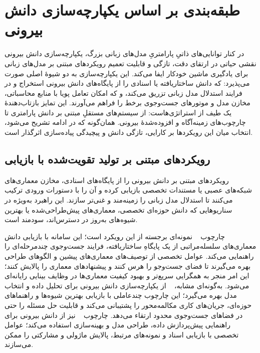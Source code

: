 \section{طبقه‌بندی بر اساس یکپارچه‌سازی دانش بیرونی}
در کنار توانایی‌های ذاتیِ پارامتریِ مدل‌های زبانی بزرگ، یکپارچه‌سازی دانش بیرونی نقشی حیاتی در ارتقای دقت، تازگی و قابلیت تعمیم رویکردهای مبتنی بر مدل‌های زبانی برای یادگیری ماشین خودکار ایفا می‌کند. این یکپارچه‌سازی به دو شیوهٔ اصلی صورت می‌پذیرد:  که دانش ساختاریافته یا اسنادی را از پایگاه‌های دانش بیرونی استخراج و در فرایند استدلال مدل زبانی تزریق می‌کند، و  که امکان تعامل پویا با منابع محاسباتی، مخازن مدل و موتورهای جست‌وجوی برخط را فراهم می‌آورند. این تمایز بازتاب‌دهندهٔ یک طیف از استراتژی‌هاست: از سیستم‌های مستقلِ مبتنی بر دانش پارامتری تا چارچوب‌های زمینه‌آگاه و افزوده‌شدهٔ بیرونی. همان‌گونه که در ادامه تشریح می‌شود، انتخاب میان این رویکردها بر کارایی، تازگی دانش و پیچیدگی پیاده‌سازی اثرگذار است.

\subsection{رویکردهای مبتنی بر تولید تقویت‌شده با بازیابی}
رویکردهای مبتنی بر  دانش بیرونی را از پایگاه‌های اسنادی، مخازن معماری‌های شبکه‌های عصبی یا مستندات تخصصی بازیابی کرده و آن را با دستورات ورودی ترکیب می‌کنند تا استدلال مدل زبانی را زمینه‌مند و غنی‌تر سازند. این راهبرد به‌ویژه در سناریوهایی که دانش حوزه‌ای تخصصی، معماری‌های پیش‌طراحی‌شده یا بهترین شیوه‌های به‌روز در دسترس‌اند، سودمند است.

چارچوب ~\cite{Yang2025NADER} نمونه‌ای برجسته از این رویکرد است؛ این سامانه با بازیابی دانش معماری‌های سلسله‌مراتبی از یک پایگاهِ ساختاریافته، فرایند جست‌وجوی چندمرحله‌ای را راهنمایی می‌کند. عوامل تخصصی از توصیف‌های معماری‌های پیشین و الگوهای طراحی بهره می‌گیرند تا فضای جست‌وجو را هرس کنند و پیشنهادهای معماری را پالایش کنند؛ این امر منجر به همگرایی سریع‌تر و بهبود کیفیت معماری‌ها در وظایف بینایی رایانه‌ای می‌شود. به‌گونه‌ای مشابه، ~\cite{zhang-etal-2024-MLCopilot} از یکپارچه‌سازی دانش بیرونی برای تحلیل داده و انتخاب مدل بهره می‌گیرد؛ این چارچوب چندعاملی با بازیابی بهترین شیوه‌ها و راهنماهای حوزه‌ای، جریان‌های کاری مکالمه‌محور را پشتیبانی می‌کند و قابلیت حل مسئله را حتی در فضاهای جست‌وجوی محدود ارتقاء می‌دهد. چارچوب ~\cite{trirat2025automlagent} نیز از دانش بیرونی برای راهنمایی پیش‌پردازش داده، طراحی مدل و بهینه‌سازی استفاده می‌کند؛ عوامل تخصصی با بازیابی اسناد و نمونه‌های مرتبط، پالایش ماژولی و مشارکتی را ممکن می‌سازند.

